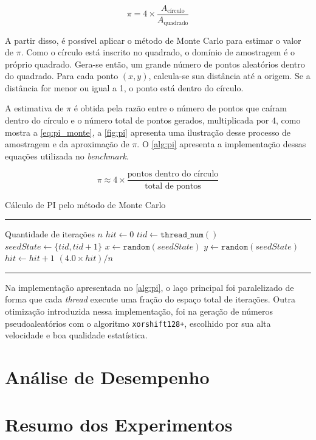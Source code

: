\begin{equation}
	\label{eq:rational_pi}
	\pi = 4 \times \frac{A_{\text{círculo}}}{A_{\text{quadrado}}}
\end{equation}

A partir disso, é possível aplicar o método de Monte Carlo para estimar o valor de $\pi$. Como o círculo está inscrito no quadrado, o domínio de amostragem é o próprio quadrado. Gera-se então, um grande número de pontos aleatórios dentro do quadrado. Para cada ponto $(x, y)$, calcula-se sua distância até a origem. Se a distância for menor ou igual a 1, o ponto está dentro do círculo.

A estimativa de $\pi$ é obtida pela razão entre o número de pontos que caíram dentro do círculo e o número total de pontos gerados, multiplicada por 4, como mostra a \autoref{eq:pi_monte}, a \autoref{fig:pi} apresenta uma ilustração desse processo de amostragem e da aproximação de $\pi$. O \autoref{alg:pi} apresenta a implementação dessas equações utilizada no \textit{benchmark}.

\begin{equation}
	\label{eq:pi_monte}
	\pi \approx 4 \times \frac{\text{pontos dentro do círculo}}{\text{total de pontos}}
\end{equation}

\begin{algorithm}[htb]
	\caption{Cálculo de PI pelo método de Monte Carlo}
	\label{alg:pi}
	\hrule
	\begin{algorithmic}[1]
		\REQUIRE Quantidade de iterações $n$
		\STATE $hit \gets 0$
		\STATE $tid \gets \texttt{thread\_num}()$
		\STATE $seedState \gets \{tid, tid + 1\}$
		\STATE $x \gets \texttt{random}(seedState)$
		\STATE $y \gets \texttt{random}(seedState)$
		\STATE $hit \gets hit + 1$
		\ENDIF
		\ENDFOR
		\RETURN $(4.0 \times hit) / n$
	\end{algorithmic}
	\hrule
	\fonte{}
\end{algorithm}

Na implementação apresentada no \autoref{alg:pi}, o laço principal foi paralelizado de forma que cada \textit{thread} execute uma fração do espaço total de iterações. Outra otimização introduzida nessa implementação, foi na geração de números pseudoaleatórios com o algoritmo \texttt{xorshift128+}, escolhido por sua alta velocidade e boa qualidade estatística.

\section{Análise de Desempenho}\label{sec:desempenho}

\section{Resumo dos Experimentos}\label{sec:resumo_exp}

